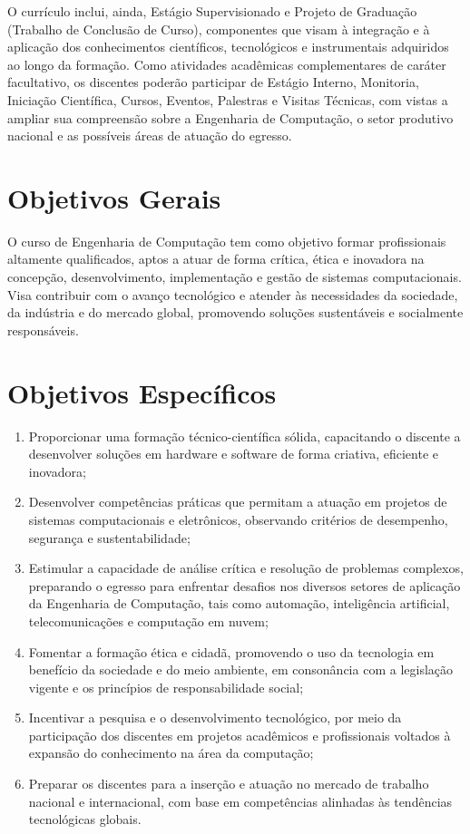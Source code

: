 O currículo inclui, ainda, Estágio Supervisionado e Projeto de Graduação (Trabalho de Conclusão de Curso), componentes que visam à integração e à aplicação dos conhecimentos científicos, tecnológicos e instrumentais adquiridos ao longo da formação. Como atividades acadêmicas complementares de caráter facultativo, os discentes poderão participar de Estágio Interno, Monitoria, Iniciação Científica, Cursos, Eventos, Palestras e Visitas Técnicas, com vistas a ampliar sua compreensão sobre a Engenharia de Computação, o setor produtivo nacional e as possíveis áreas de atuação do egresso.

\section{Objetivos Gerais}

O curso de Engenharia de Computação tem como objetivo formar profissionais altamente qualificados, aptos a atuar de forma crítica, ética e inovadora na concepção, desenvolvimento, implementação e gestão de sistemas computacionais. Visa contribuir com o avanço tecnológico e atender às necessidades da sociedade, da indústria e do mercado global, promovendo soluções sustentáveis e socialmente responsáveis.

\section{Objetivos Específicos}

\begin{enumerate}
    \item Proporcionar uma formação técnico-científica sólida, capacitando o discente a desenvolver soluções em hardware e software de forma criativa, eficiente e inovadora;

    \item Desenvolver competências práticas que permitam a atuação em projetos de sistemas computacionais e eletrônicos, observando critérios de desempenho, segurança e sustentabilidade;

    \item Estimular a capacidade de análise crítica e resolução de problemas complexos, preparando o egresso para enfrentar desafios nos diversos setores de aplicação da Engenharia de Computação, tais como automação, inteligência artificial, telecomunicações e computação em nuvem;

    \item Fomentar a formação ética e cidadã, promovendo o uso da tecnologia em benefício da sociedade e do meio ambiente, em consonância com a legislação vigente e os princípios de responsabilidade social;

    \item Incentivar a pesquisa e o desenvolvimento tecnológico, por meio da participação dos discentes em projetos acadêmicos e profissionais voltados à expansão do conhecimento na área da computação;

    \item Preparar os discentes para a inserção e atuação no mercado de trabalho nacional e internacional, com base em competências alinhadas às tendências tecnológicas globais.
\end{enumerate}

